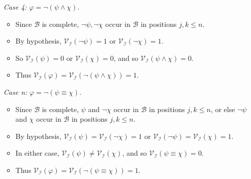 \documentclass[a4paper, 11pt]{article} %
\newcommand{\I}{\mathcal{I}}
\newcommand{\B}{\mathcal{B}}
\newcommand{\V}[1]{\mathcal{V}_{#1}} %
\begin{document}
\begin{enumerate}
  \item[\it Case 4:] $\varphi=\neg(\psi\wedge\chi)$.
    \begin{itemize}
      \item Since $\B$ is complete, $\neg\psi,\neg\chi$ occur in $\B$ in positions $j,k\leq n$. 
      \item By hypothesis, $\V{\I}(\neg\psi)=1$ or $\V{\I}(\neg\chi)=1$.
      \item So $\V{\I}(\psi)=0$ or $\V{\I}(\chi)=0$, and so $\V{\I}(\psi\wedge\chi)=0$.
      \item Thus $\V{\I}(\varphi)=\V{\I}(\neg(\psi\wedge\chi))=1$.
    \end{itemize}
  \item[\it Case n:] $\varphi=\neg(\psi\equiv\chi)$.
    \begin{itemize}
      \item Since $\B$ is complete, $\psi$ and $\neg\chi$ occur in $\B$ in positions $j,k\leq n$, or else $\neg\psi$ and $\chi$ occur in $\B$ in positions $j,k\leq n$.
      \item By hypothesis, $\V{\I}(\psi)=\V{\I}(\neg\chi)=1$ or $\V{\I}(\neg\psi)=\V{\I}(\chi)=1$.  
      \item In either case, $\V{\I}(\psi)\neq\V{\I}(\chi)$, and so $\V{\I}(\psi\equiv\chi)=0$.
      \item Thus $\V{\I}(\varphi)=\V{\I}(\neg(\psi\equiv\chi))=1$.
    \end{itemize}
\end{enumerate}
\end{document}
